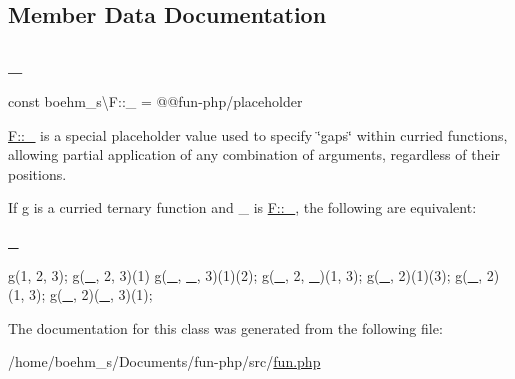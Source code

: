 \subsection{Member Data Documentation}
\mbox{\label{classboehm__s_1_1F_ab837ec3c9abe3d1a244817fd4c18eda7}} 
\subsubsection{\texorpdfstring{\+\_\+}{\_}}
{\footnotesize\ttfamily const boehm\+\_\+s\textbackslash{}\+F\+::\+\_\+ = \textquotesingle{}@@fun-\/php/placeholder\textquotesingle{}}



{\ttfamily \hyperlink{classboehm__s_1_1F_ab837ec3c9abe3d1a244817fd4c18eda7}{F\+::\+\_\+}} is a special placeholder value used to specify \char`\"{}gaps\char`\"{} within curried functions, allowing partial application of any combination of arguments, regardless of their positions. 

If g is a curried ternary function and {\ttfamily \+\_\+} is {\ttfamily \hyperlink{classboehm__s_1_1F_ab837ec3c9abe3d1a244817fd4c18eda7}{F\+::\+\_\+}}, the following are equivalent\+:


\begin{DoxyCode}
\hyperlink{classboehm__s_1_1F_ab837ec3c9abe3d1a244817fd4c18eda7}{\_} 
\end{DoxyCode}



\begin{DoxyCode}
g(1, 2, 3);
g(\hyperlink{classboehm__s_1_1F_ab837ec3c9abe3d1a244817fd4c18eda7}{\_}, 2, 3)(1)
g(\hyperlink{classboehm__s_1_1F_ab837ec3c9abe3d1a244817fd4c18eda7}{\_}, \hyperlink{classboehm__s_1_1F_ab837ec3c9abe3d1a244817fd4c18eda7}{\_}, 3)(1)(2);
g(\hyperlink{classboehm__s_1_1F_ab837ec3c9abe3d1a244817fd4c18eda7}{\_}, 2, \hyperlink{classboehm__s_1_1F_ab837ec3c9abe3d1a244817fd4c18eda7}{\_})(1, 3);
g(\hyperlink{classboehm__s_1_1F_ab837ec3c9abe3d1a244817fd4c18eda7}{\_}, 2)(1)(3);
g(\hyperlink{classboehm__s_1_1F_ab837ec3c9abe3d1a244817fd4c18eda7}{\_}, 2)(1, 3);
g(\hyperlink{classboehm__s_1_1F_ab837ec3c9abe3d1a244817fd4c18eda7}{\_}, 2)(\hyperlink{classboehm__s_1_1F_ab837ec3c9abe3d1a244817fd4c18eda7}{\_}, 3)(1);
\end{DoxyCode}
 

The documentation for this class was generated from the following file\+:\begin{DoxyCompactItemize}
\item 
/home/boehm\+\_\+s/\+Documents/fun-\/php/src/\hyperlink{fun_8php}{fun.\+php}\end{DoxyCompactItemize}
